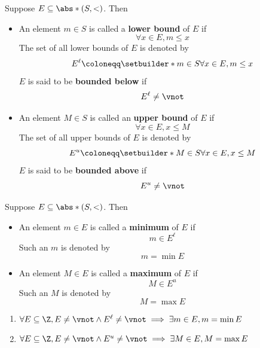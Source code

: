 \begin{definition} \label{an1:def:boundedness}
  Suppose $E \subseteq \abs*{(S, <)}$. Then
  \begin{itemize}
    \item An element $m \in S$ is called a \textbf{lower bound} of $E$ if
          \[
            \forall x \in E, m \leq x
          \]
          The set of all lower bounds of $E$ is denoted by
          \[
            E^{\ell} \coloneqq \setbuilder*{m \in S}{\forall x \in E, m \leq x}
          \]
          $E$ is said to be \textbf{bounded below} if
          \[
            E^{\ell} \neq \vnot
          \]
    \item An element $M \in S$ is called an \textbf{upper bound} of $E$ if
          \[
            \forall x \in E, x \leq M
          \]
          The set of all upper bounds of $E$ is denoted by
          \[
            E^{u} \coloneqq \setbuilder*{M \in S}{\forall x \in E, x \leq M}
          \]
          $E$ is said to be \textbf{bounded above} if
          \[
            E^{u} \neq \vnot
          \]
  \end{itemize}
\end{definition}

\begin{definition} \label{an1:def:extremum}
  Suppose $E \subseteq \abs*{(S, <)}$. Then
  \begin{itemize}
    \item An element $m \in E$ is called a \textbf{minimum} of $E$ if
          \[
            m \in E^{\ell}
          \]
          Such an $m$ is denoted by
          \[
            m = \min E
          \]
    \item An element $M \in E$ is called a \textbf{maximum} of $E$ if
          \[
            M \in E^{u}
          \]
          Such an $M$ is denoted by
          \[
            M = \max E
          \]
  \end{itemize}
\end{definition}

\begin{theorem} \label{an1:thm:bounded-subset-of-Z-in-Z-has-extremum}
  \leavevmode\par
  \begin{enumerate}[label=\textbf{(\Alph*)}]
    \item $\forall E \subseteq \Z, E \neq \vnot \land E^{\ell} \neq \vnot \implies \exists m \in E, m = \min E$
    \item $\forall E \subseteq \Z, E \neq \vnot \land E^{u} \neq \vnot \implies \exists M \in E, M = \max E$
  \end{enumerate}
\end{theorem}

